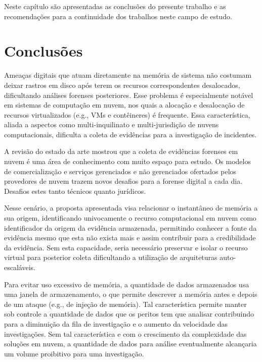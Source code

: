 %
Neste capítulo são apresentadas as conclusões do presente trabalho e as recomendações para a continuidade dos trabalhos neste campo de estudo.

\section{Conclusões}
\label{sec:proposta-concl}

%
Ameaças digitais que atuam diretamente na memória de sistema não costumam deixar rastros em disco após terem os recursos correspondentes desalocados, dificultando análises forenses posteriores.
%
Esse problema é especialmente notável em sistemas de computação em nuvem, nos quais a alocação e desalocação de recursos virtualizados (e.g., VMs e contêineres) é frequente.
%
Essa característica, aliada a aspectos como multi-inquilinato e multi-jurisdição de nuvens computacionais, dificulta a coleta de evidências para a investigação de incidentes.
%

A revisão do estado da arte mostrou que a coleta de evidências forenses em nuvem é uma área de conhecimento com muito espaço para estudo.
%
Os modelos de comercialização e serviços gerenciados e não gerenciados ofertados pelos provedores de nuvem trazem novos desafios para a forense digital a cada dia.
%
Desafios estes tanto técnicos quanto jurídicos.
%

Nesse cenário, a proposta apresentada visa relacionar o instantâneo de memória a sua origem, identificando univocamente o recurso computacional em nuvem como identificador da origem da evidência armazenada, permitindo conhecer a fonte da evidência mesmo que esta não exista mais e assim contribuir para a credibilidade da evidência.
%
Sem esta capacidade, seria necessário preservar e isolar o recurso virtual para posterior coleta dificultando a utilização de arquiteturas auto-escaláveis.
%

Para evitar uso excessivo de memória, a quantidade de dados armazenados usa uma janela de armazenamento, o que permite descrever a memória antes e depois de um ataque (e.g., de injeção de memória). 
%
Tal característica permite manter sob controle a quantidade de dados que os peritos tem que analisar contribuindo para a diminuição da fila de investigação e o aumento da velocidade das investigações.
%
Sem tal característica e com o crescimento da complexidade das soluções em nuvem, a quantidade de dados para análise eventualmente alcançaria um volume proibitivo para uma investigação.
%

